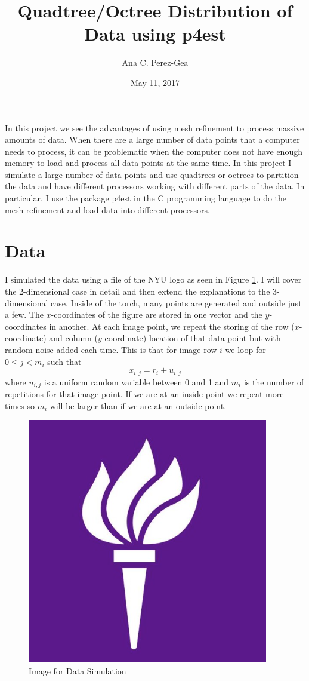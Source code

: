 \documentclass[12pt,letterpaper]{article}
\title{Quadtree/Octree Distribution of Data using p4est}
\author{Ana C. Perez-Gea}
\date{May 11, 2017}
\begin{document}
\maketitle

In this project we see the advantages of using mesh refinement to process massive amounts of data. When there are a large number of data points that a computer needs to process, it can be problematic when the computer does not have enough memory to load and process all data points at the same time. In this project I simulate a large number of data points and use quadtrees or octrees to partition the data and have different processors working with different parts of the data.  In particular, I use the package p4est in the C programming language to do the mesh refinement and load data into different processors.

\section{Data}

I simulated the data using a file of the NYU logo as seen in Figure \ref{nyu_logo}. I will cover the 2-dimensional case in detail and then extend the explanations to the 3-dimensional case. Inside of the torch, many points are generated and outside just a few. The $x$-coordinates of the figure are stored in one vector and the $y$-coordinates in another. At each image point, we repeat the storing of the row ($x$-coordinate) and column ($y$-coordinate) location of that data point but with random noise added each time. This is that for image row $i$ we loop for $0\leq j< m_i$ such that \[x_{i,j} = r_i + u_{i,j}\] where $u_{i,j}$ is a uniform random variable between 0 and 1 and $m_i$ is the number of repetitions for that image point. If we are at an inside point we repeat more times so $m_i$ will be larger than if we are at an outside point.

\begin{figure}[h]
\centering
\caption{Image for Data Simulation}
\label{nyu_logo}
\includegraphics[width=.3\textwidth]{NYU_logo}
\end{figure}
\end{document}

